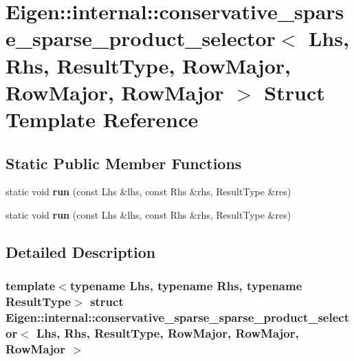 \hypertarget{struct_eigen_1_1internal_1_1conservative__sparse__sparse__product__selector_3_01_lhs_00_01_rhs_01e3769f60835369078028e205b540c14}{}\section{Eigen\+:\+:internal\+:\+:conservative\+\_\+sparse\+\_\+sparse\+\_\+product\+\_\+selector$<$ Lhs, Rhs, Result\+Type, Row\+Major, Row\+Major, Row\+Major $>$ Struct Template Reference}
\label{struct_eigen_1_1internal_1_1conservative__sparse__sparse__product__selector_3_01_lhs_00_01_rhs_01e3769f60835369078028e205b540c14}
\subsection*{Static Public Member Functions}
\begin{DoxyCompactItemize}
\item 
\mbox{\label{struct_eigen_1_1internal_1_1conservative__sparse__sparse__product__selector_3_01_lhs_00_01_rhs_01e3769f60835369078028e205b540c14_a1a728638529c6e9e198464483e581caa}} 
static void {\bfseries run} (const Lhs \&lhs, const Rhs \&rhs, Result\+Type \&res)
\item 
\mbox{\label{struct_eigen_1_1internal_1_1conservative__sparse__sparse__product__selector_3_01_lhs_00_01_rhs_01e3769f60835369078028e205b540c14_a1a728638529c6e9e198464483e581caa}} 
static void {\bfseries run} (const Lhs \&lhs, const Rhs \&rhs, Result\+Type \&res)
\end{DoxyCompactItemize}


\subsection{Detailed Description}
\subsubsection*{template$<$typename Lhs, typename Rhs, typename Result\+Type$>$\newline
struct Eigen\+::internal\+::conservative\+\_\+sparse\+\_\+sparse\+\_\+product\+\_\+selector$<$ Lhs, Rhs, Result\+Type, Row\+Major, Row\+Major, Row\+Major $>$}



